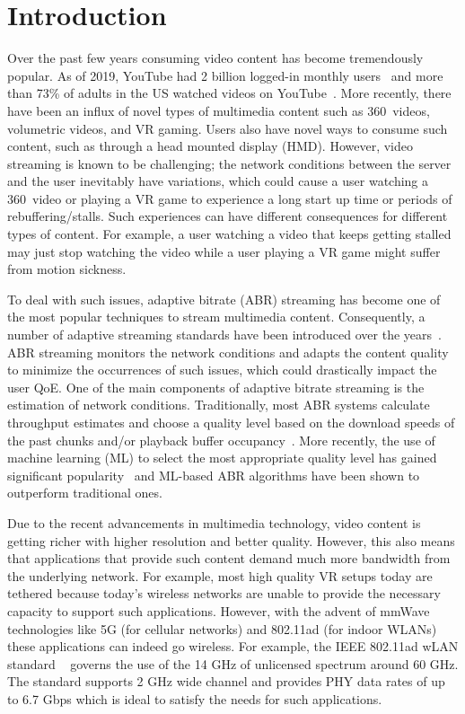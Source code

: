 \documentclass[sigconf,anonymous]{acmart}
\begin{document}
\graphicspath{{figs/}}

\section{Introduction} %

Over the past few years consuming video content has become
tremendously popular. As of 2019, YouTube had 2 billion logged-in
monthly users~\cite{statista} and more than 73\% of adults in the US
watched videos on YouTube~\cite{pew-research}. More recently, there
have been an influx of novel types of multimedia content such as
360\degree~videos, volumetric videos, and VR gaming. Users also have
novel ways to consume such content, such as through a head mounted
display (HMD). 
However, video streaming is
known to be challenging; the network conditions between the server and
the user inevitably have variations, which could cause a user watching
a 360\degree~video or playing a VR game to experience a long start up
time or periods of rebuffering/stalls. Such experiences can have
different consequences for different types of content. For example, a
user watching a video that keeps getting stalled may just stop
watching the video while a user playing a VR game might suffer from
motion sickness.

To deal with such issues, adaptive bitrate (ABR) streaming has become
one of the most popular techniques to stream multimedia
content. Consequently, a number of adaptive streaming standards have
been introduced over the years~\cite{stockhammer:mmsys2011,
  pantos-hls, adobe-hds, microsoft-ss}. ABR streaming monitors the
network conditions and adapts the content quality to minimize the
occurrences of such issues, which could drastically impact the user
QoE. One of the main components of adaptive bitrate streaming is the
estimation of network conditions. Traditionally, most ABR systems
calculate throughput estimates and choose a quality level based on the
download speeds of the past chunks and/or playback buffer
occupancy~\cite{sun:sigcomm2016, spiteri:infocom2016}. More recently,
the use of machine learning (ML) to select the most appropriate
quality level has gained significant popularity~\cite{mao:sigcomm2017,
  yan:nsdi2020} and ML-based ABR algorithms have been shown to
outperform traditional ones.

Due to the recent advancements in multimedia technology, video content is getting richer with higher resolution and better quality. However, this also means that applications that provide such content demand much more bandwidth from the underlying network. For example, most high quality VR setups today are tethered because today's wireless networks are unable to provide the necessary capacity to support such applications. However, with the advent of mmWave technologies like 5G (for cellular networks) and 802.11ad (for indoor WLANs) these applications can indeed go wireless. For example, the IEEE 802.11ad wLAN standard ~\cite{80211ad} governs the use of the 14 GHz of unlicensed spectrum around 60 GHz. The standard supports 2 GHz wide channel and provides PHY data rates of up to 6.7 Gbps which is ideal to satisfy the needs for such applications.
\end{document}
